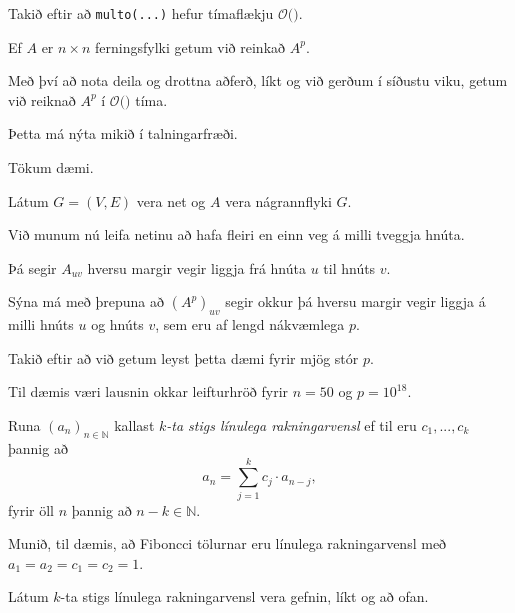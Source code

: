 {
}

{
	{
		\item<1-> Takið eftir að \texttt{multo(...)} hefur tímaflækju $\mathcal{O}($\onslide<2->{$n^3$}$)$.
		\item<3-> Ef $A$ er $n \times n$ ferningsfylki getum við reinkað $A^p$.
		\item<4-> Með því að nota deila og drottna aðferð, líkt og við gerðum í síðustu viku, getum við reiknað $A^p$ í
					$\mathcal{O}($\onslide<5->{$n^3 \log p$}$)$ tíma.
		\item<5-> Þetta má nýta mikið í talningarfræði.
		\item<6-> Tökum dæmi.
	}
}

{
	{
		\item<1-> Látum $G = (V, E)$ vera net og $A$ vera nágrannflyki $G$.
		\item<2-> Við munum nú leifa netinu að hafa fleiri en einn veg á milli tveggja hnúta.
		\item<3-> Þá segir $A_{uv}$ hversu margir vegir liggja frá hnúta $u$ til hnúts $v$.
		\item<4-> Sýna má með þrepuna að $(A^p)_{uv}$ segir okkur þá hversu margir vegir liggja á milli hnúts $u$ og hnúts $v$,
					sem eru af lengd nákvæmlega $p$.
		\item<5-> Takið eftir að við getum leyst þetta dæmi fyrir mjög stór $p$.
		\item<6-> Til dæmis væri lausnin okkar leifturhröð fyrir $n = 50$ og $p = 10^{18}$.
	}
}

{
	{
		\item<1-> Runa $(a_n)_{n \in \mathbb{N}}$ kallast \emph{$k$-ta stigs línulega rakningarvensl} ef til eru $c_1, ..., c_k$ þannig að
		\[
			a_n = \sum_{j = 1}^k c_j \cdot a_{n - j},
		\]
		fyrir öll $n$ þannig að $n - k \in \mathbb{N}$.
		\item<2-> Munið, til dæmis, að Fiboncci tölurnar eru línulega rakningarvensl með $a_1 = a_2 = c_1 = c_2 = 1$.
		\item<3-> Látum $k$-ta stigs línulega rakningarvensl vera gefnin, líkt og að ofan.
	}
}

